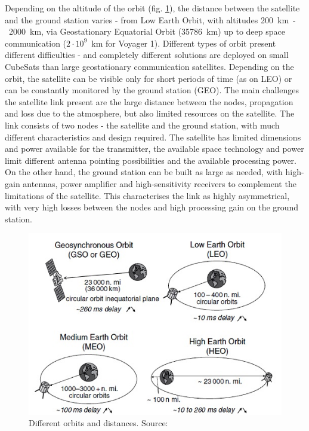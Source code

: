 Depending on the altitude of the orbit (fig. \ref{intro:orbits}), the distance between the satellite and the ground station varies - from Low Earth Orbit, with altitudes \SI{200}{\kilo\meter}~-~\SI{2000}{\kilo\meter}, via Geostationary Equatorial Orbit (\SI{35786}{\kilo\meter}) up to deep space communication ($2\cdot 10^{9}$~km for Voyager 1). Different types of orbit present different difficulties - and completely different solutions are deployed on small CubeSats than large geostationary communication satellites. Depending on the orbit, the satellite can be visible only for short periods of time (as on LEO) or can be constantly monitored by the ground station (GEO). The main challenges the satellite link present are the large distance between the nodes, propagation and loss due to the atmosphere, but also limited resources on the satellite. The link consists of two nodes - the satellite and the ground station, with much different characteristics and design required. The satellite has limited dimensions and power available for the transmitter, the available space technology and power limit different antenna pointing possibilities and the available processing power. On the other hand, the ground station can be built as large as needed, with high-gain antennas, power amplifier and high-sensitivity receivers to complement the limitations of the satellite. This characterises the link as highly asymmetrical, with very high losses between the nodes and high processing gain on the ground station.
\begin{figure}
    \centering
    \includegraphics[width=0.4\paperwidth]{img/2/orbit_types.jpg}
    \caption{Different orbits and distances. Source: \cite{satcom_decription}}
    \label{intro:orbits}
\end{figure}

